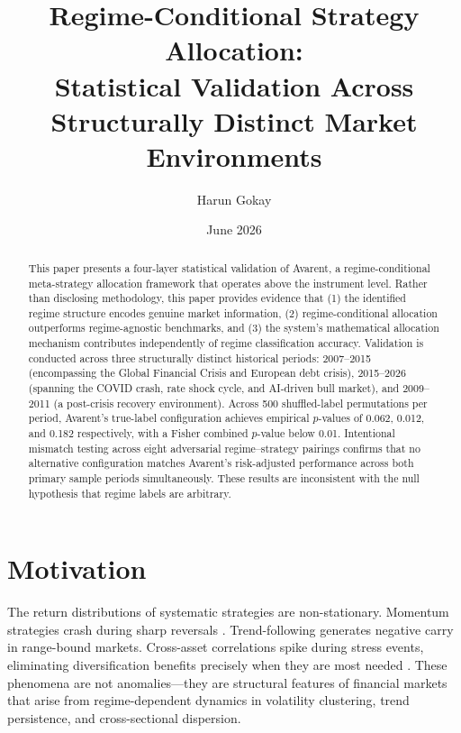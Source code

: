 \documentclass[12pt]{article}
\title{Regime-Conditional Strategy Allocation:\\
Statistical Validation Across Structurally Distinct Market Environments}
\author{Harun Gokay}
\date{June 2026}
\begin{document}
\maketitle

\begin{abstract}
\noindent
This paper presents a four-layer statistical validation of Avarent, a regime-conditional meta-strategy allocation framework that operates above the instrument level.
Rather than disclosing methodology, this paper provides evidence that (1) the identified regime structure encodes genuine market information, (2) regime-conditional allocation outperforms regime-agnostic benchmarks, and (3) the system's mathematical allocation mechanism contributes independently of regime classification accuracy.
Validation is conducted across three structurally distinct historical periods: 2007--2015 (encompassing the Global Financial Crisis and European debt crisis), 2015--2026 (spanning the COVID crash, rate shock cycle, and AI-driven bull market), and 2009--2011 (a post-crisis recovery environment).
Across 500 shuffled-label permutations per period, Avarent's true-label configuration achieves empirical $p$-values of 0.062, 0.012, and 0.182 respectively, with a Fisher combined $p$-value below 0.01.
Intentional mismatch testing across eight adversarial regime--strategy pairings confirms that no alternative configuration matches Avarent's risk-adjusted performance across both primary sample periods simultaneously.
These results are inconsistent with the null hypothesis that regime labels are arbitrary.
\end{abstract}

\newpage
\tableofcontents
\newpage

\section{Motivation}

The return distributions of systematic strategies are non-stationary.
Momentum strategies crash during sharp reversals \citep{asness2013}.
Trend-following generates negative carry in range-bound markets.
Cross-asset correlations spike during stress events, eliminating diversification benefits precisely when they are most needed \citep{ang2002}.
These phenomena are not anomalies---they are structural features of financial markets that arise from regime-dependent dynamics in volatility clustering, trend persistence, and cross-sectional dispersion.
\end{document}
